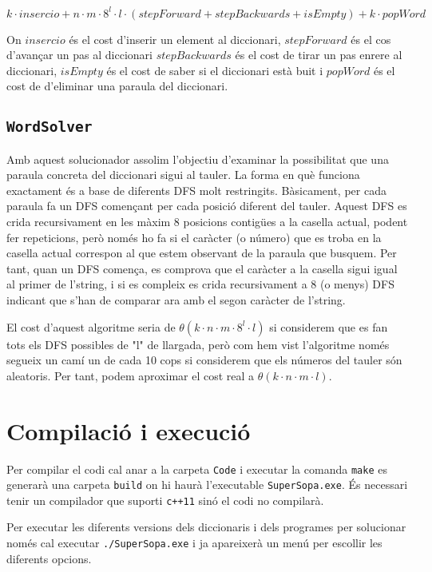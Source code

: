﻿\documentclass{article}
\begin{document}
\[ k·insercio + n·m·8^l·l·(stepForward + stepBackwards + isEmpty) + k·popWord \]

On $insercio$ és el cost d'inserir un element al diccionari, $stepForward$ és el cos d'avançar un pas al diccionari $stepBackwards$ és el cost de tirar un pas enrere al diccionari, $isEmpty$ és el cost de saber si el diccionari està buit i $popWord$ és el
cost de d'eliminar una paraula del diccionari.

\subsection{\texttt{WordSolver}}

Amb aquest solucionador assolim l'objectiu d'examinar la possibilitat que una paraula concreta del diccionari sigui al tauler.
La forma en què funciona exactament és a base de diferents DFS molt restringits. Bàsicament, per cada paraula fa un DFS començant per cada posició diferent del tauler.
Aquest DFS es crida recursivament en les màxim 8 posicions contigües a la casella actual, podent fer repeticions, però només ho fa si el caràcter (o número) que es troba en la casella actual correspon al que estem observant de la paraula que busquem.
Per tant, quan un DFS comença, es comprova que el caràcter a la casella sigui igual al primer de l'string, i si es compleix es crida recursivament a 8 (o menys) DFS indicant que s'han de comparar ara amb el segon caràcter de l'string.

El cost d'aquest algoritme seria de $\theta(k·n·m·8^l·l)$ si considerem que es fan tots els DFS possibles de "l" de llargada, però com hem vist l'algoritme només segueix un camí un de cada 10 cops si considerem que els números del tauler són aleatoris.
Per tant, podem aproximar el cost real a $\theta(k·n·m·l)$.

\section{Compilació i execució}

Per compilar el codi cal anar a la carpeta \verb|Code| i executar la comanda \verb|make| es generarà una carpeta \verb|build| on hi haurà l'executable \verb|SuperSopa.exe|. És necessari tenir un compilador que suporti \verb|c++11| sinó el codi no compilarà.

Per executar les diferents versions dels diccionaris i dels programes per solucionar només cal executar \verb|./SuperSopa.exe| i ja apareixerà un menú per escollir les diferents opcions. 
\end{document}
